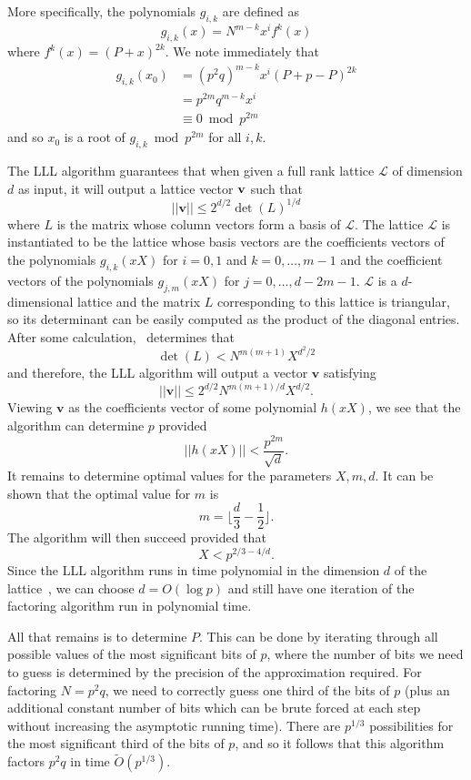 \documentclass[letterpaper,twocolumn,10pt]{article}
\begin{document}
More specifically, the polynomials $g_{i,k}$ are defined as
\[
g_{i,k}(x) = N^{m-k}x^i f^k(x)
\]
where $f^k(x) = (P+x)^{2k}$. We note immediately that
\begin{align*}
g_{i,k}(x_0) &= (p^2q)^{m-k} x^i (P + p - P)^{2k} \\
&= p^{2m}q^{m-k}x^i \\
&\equiv 0 \bmod p^{2m}
\end{align*}
and so $x_0$ is a root of $g_{i,k} \bmod p^{2m}$ for all $i,k$. 

The LLL algorithm guarantees that when given a full rank lattice $\mathcal{L}$ of dimension $d$ as input, it will output a lattice vector $\bf{v}$ such that
\[
||\textbf{v}|| \leq 2^{d/2} \det(L)^{1/d}
\]
where $L$ is the matrix whose column vectors form a basis of $\mathcal{L}$. The lattice $\mathcal{L}$ is instantiated to be the lattice whose basis vectors are the coefficients vectors of the polynomials $g_{i,k}(xX)$ for $i = 0,1$ and $k = 0, \hdots, m-1$ and the coefficient vectors of the polynomials $g_{j,m}(xX)$ for $j = 0, \hdots, d - 2m - 1$. $\mathcal{L}$ is a $d$-dimensional lattice and the matrix $L$ corresponding to this lattice is triangular, so its determinant can be easily computed as the product of the diagonal entries. After some calculation,~\cite{dan} determines that
\[
\det(L) < N^{m(m+1)}X^{d^2/2}
\] 
and therefore, the LLL algorithm will output a vector $\textbf{v}$ satisfying
\[
||\textbf{v}|| \leq 2^{d/2} N^{m(m+1)/d}X^{d/2}.
\]
Viewing $\textbf{v}$ as the coefficients vector of some polynomial $h(xX)$, we see that the algorithm can determine $p$ provided
\[
||h(xX)|| < \frac{p^{2m}}{\sqrt{d}}.
\]
It remains to determine optimal values for the parameters $X, m, d$. It can be shown that the optimal value for $m$ is
\[
m = \lfloor \frac{d}{3} - \frac{1}{2} \rfloor.
\]
The algorithm will then succeed provided that 
\[
X < p^{2/3 - 4/d}.
\]
Since the LLL algorithm runs in time polynomial in the dimension $d$ of the lattice~\cite{LLL}, we can choose $d = O(\log p)$ and still have one iteration of the factoring algorithm run in polynomial time. 

All that remains is to determine $P$. This can be done by iterating through all possible values of the most significant bits of $p$, where the number of bits we need to guess is determined by the precision of the approximation required. For factoring $N = p^2 q$, we need to correctly guess one third of the bits of $p$ (plus an additional constant number of bits which can be brute forced at each step without increasing the asymptotic running time). There are $p^{1/3}$ possibilities for the most significant third of the bits of $p$, and so it follows that this algorithm factors $p^2 q$ in time $\tilde{O}(p^{1/3})$.
\end{document}
